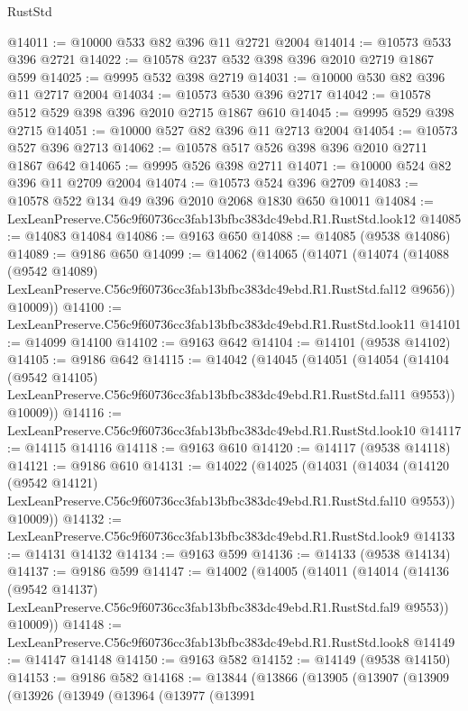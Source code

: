 \begin{lexlean}{RustStd}
\begin{coremodule}
@14011 := @10000 @533 @82 @396 @11 @2721 @2004
@14014 := @10573 @533 @396 @2721
@14022 := @10578 @237 @532 @398 @396 @2010 @2719 @1867 @599
@14025 := @9995 @532 @398 @2719
@14031 := @10000 @530 @82 @396 @11 @2717 @2004
@14034 := @10573 @530 @396 @2717
@14042 := @10578 @512 @529 @398 @396 @2010 @2715 @1867 @610
@14045 := @9995 @529 @398 @2715
@14051 := @10000 @527 @82 @396 @11 @2713 @2004
@14054 := @10573 @527 @396 @2713
@14062 := @10578 @517 @526 @398 @396 @2010 @2711 @1867 @642
@14065 := @9995 @526 @398 @2711
@14071 := @10000 @524 @82 @396 @11 @2709 @2004
@14074 := @10573 @524 @396 @2709
@14083 := @10578 @522 @134 @49 @396 @2010 @2068 @1830 @650 @10011
@14084 := LexLeanPreserve.C56c9f60736cc3fab13bfbc383dc49ebd.R1.RustStd.look12
@14085 := @14083 @14084
@14086 := @9163 @650
@14088 := @14085 (@9538 @14086)
@14089 := @9186 @650
@14099 := @14062
    (@14065
      (@14071
        (@14074
          (@14088
            (@9542 @14089)
            LexLeanPreserve.C56c9f60736cc3fab13bfbc383dc49ebd.R1.RustStd.fal12
            @9656))
        @10009))
@14100 := LexLeanPreserve.C56c9f60736cc3fab13bfbc383dc49ebd.R1.RustStd.look11
@14101 := @14099 @14100
@14102 := @9163 @642
@14104 := @14101 (@9538 @14102)
@14105 := @9186 @642
@14115 := @14042
    (@14045
      (@14051
        (@14054
          (@14104
            (@9542 @14105)
            LexLeanPreserve.C56c9f60736cc3fab13bfbc383dc49ebd.R1.RustStd.fal11
            @9553))
        @10009))
@14116 := LexLeanPreserve.C56c9f60736cc3fab13bfbc383dc49ebd.R1.RustStd.look10
@14117 := @14115 @14116
@14118 := @9163 @610
@14120 := @14117 (@9538 @14118)
@14121 := @9186 @610
@14131 := @14022
    (@14025
      (@14031
        (@14034
          (@14120
            (@9542 @14121)
            LexLeanPreserve.C56c9f60736cc3fab13bfbc383dc49ebd.R1.RustStd.fal10
            @9553))
        @10009))
@14132 := LexLeanPreserve.C56c9f60736cc3fab13bfbc383dc49ebd.R1.RustStd.look9
@14133 := @14131 @14132
@14134 := @9163 @599
@14136 := @14133 (@9538 @14134)
@14137 := @9186 @599
@14147 := @14002
    (@14005
      (@14011
        (@14014
          (@14136
            (@9542 @14137)
            LexLeanPreserve.C56c9f60736cc3fab13bfbc383dc49ebd.R1.RustStd.fal9
            @9553))
        @10009))
@14148 := LexLeanPreserve.C56c9f60736cc3fab13bfbc383dc49ebd.R1.RustStd.look8
@14149 := @14147 @14148
@14150 := @9163 @582
@14152 := @14149 (@9538 @14150)
@14153 := @9186 @582
@14168 := @13844
    (@13866
      (@13905
        (@13907
          (@13909
            (@13926
              (@13949
                (@13964
                  (@13977
                    (@13991

\end{coremodule}
\end{lexlean}
